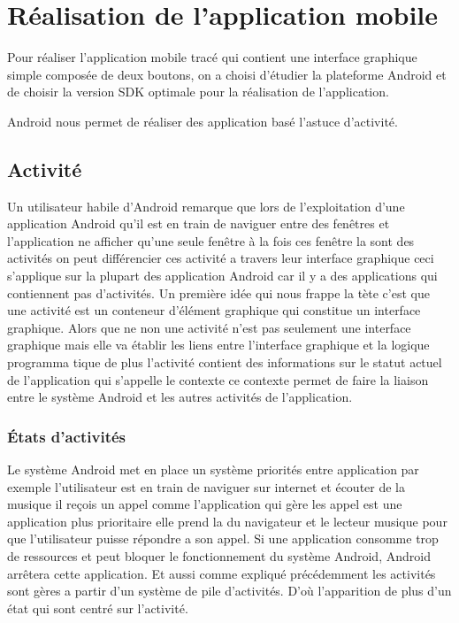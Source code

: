 \section{Réalisation de l'application mobile}

Pour réaliser l'application mobile tracé qui contient une interface graphique
simple composée de deux boutons, on a choisi d'étudier la plateforme Android et
de choisir la version SDK optimale pour la réalisation de l'application.

Android nous permet de réaliser des application basé l'astuce d'activité.

\subsection{Activité}

Un utilisateur habile d'Android remarque que lors de l'exploitation d'une
application Android qu'il est en train de naviguer entre des fenêtres et
l'application ne afficher qu'une seule fenêtre à la fois ces fenêtre la sont
des activités on peut différencier ces activité a travers leur interface
graphique ceci s'applique sur la plupart des application Android car il y a des
applications qui contiennent pas d'activités. Un première idée qui nous frappe
la tète c'est que une activité est un conteneur d'élément graphique qui
constitue un interface graphique. Alors que ne non une activité n'est pas
seulement une interface graphique mais elle va établir les liens entre
l'interface graphique et la logique programma tique de plus l'activité contient
des informations sur le statut actuel de l'application qui s'appelle le
contexte ce contexte permet de faire la liaison entre le système Android et les
autres activités de l'application.

\subsubsection{États d'activités}

Le système Android met en place un système priorités entre application par
exemple l'utilisateur est en train de naviguer sur internet et écouter de la
musique il reçois un appel comme l'application qui gère les appel est une
application plus prioritaire elle prend la du navigateur et le lecteur musique
pour que l'utilisateur puisse répondre a son appel. Si une application consomme
trop de ressources et peut bloquer le fonctionnement du système Android,
Android arrêtera cette application. Et aussi comme expliqué précédemment les
activités sont gères a partir d'un système de pile d'activités. D'où
l'apparition de plus d'un état qui sont centré sur l'activité.

